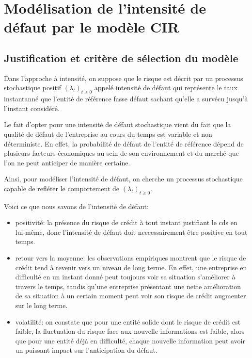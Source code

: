 \chapter{Modélisation de l'intensité de défaut par le modèle CIR}

\section{Justification et critère de sélection du modèle}

Dans l'approche à intensité, on suppose que le risque est décrit par un processus stochastique positif $(\lambda_t)_{t \ge 0}$ appelé intensité de défaut qui représente le taux instantanné que l'entité de référence fasse défaut sachant qu'elle a survécu jusqu'à l'instant considéré.

Le fait d'opter pour une intensité de défaut stochastique vient du fait que la qualité de défaut de l'entreprise au cours du temps est variable et non déterministe. En effet, la probabilité de défaut de l'entité de référence dépend de plusieurs facteurs économiques au sein de son environnement et du marché que l'on ne peut anticiper de manière certaine.

Ainsi, pour modéliser l'intensité de défaut, on cherche un processus stochastique capable de refléter le comportement de $(\lambda_t)_{t \ge 0}$.

Voici ce que nous savons de l'intensité de défaut:

\begin{itemize}
    \item positivité: la présence du risque de crédit à tout instant justifiant le \gls{cds} en lui-même, donc l'intensité de défaut doit neecessairement être positive en tout temps.
    \item retour vers la moyenne: les observations empiriques montrent que le risque de crédit tend à revenir vers un niveau de long terme. En effet, une entreprise en difficulté en un instant donné peut toujours voir sa situation s'améliorer à travers le temps, tandis qu'une entreprise présentant une nette amélioration de sa situation à un certain moment peut voir son risque de crédit augmenter sur le long terme.
    \item volatilité: on constate que pour une entité solide dont le risque de crédit est faible, la fluctuation du risque face aux nouvelle informations est faible, alors que pour une entité déjà en difficulté, chaque nouvelle information peut avoir un puissant impact sur l'anticipation du défaut.
\end{itemize}

